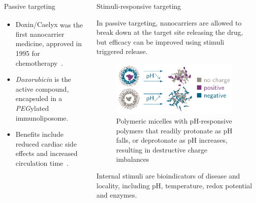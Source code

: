 \documentclass[final]{beamer}
\begin{document}
\begin{frame}[plain]
\begin{columns}[t,onlytextwidth]
\begin{block}{Passive targeting\strut}
        \begin{example}
          \begin{itemize}
            \item \alert{Doxin\textsuperscript{\textregistered}/Caelyx\textsuperscript{\textregistered}} was the first nanocarrier medicine, approved in 1995 for chemotherapy~\cite{harrison1995liposomal}.

            \item \emph{Doxorubicin} is the active compound, encapsuled in a \emph{PEG}ylated \alert{immunoliposome}.

            \item Benefits include \alert{reduced cardiac side effects} and \alert{increased circulation time}~\cite{wicki2015nanomedicine}.

          \end{itemize}
        \end{example}

      \end{block}

      \begin{block}{Stimuli-responsive targeting\strut}

        In \alert{passive targeting}, nanocarriers are allowed to break down at the target site releasing the drug, but efficacy can be improved using \alert{stimuli triggered release}.

        \begin{figure}
          \centering
          \includegraphics[scale=2.4]{tikz/ph_responsive.pdf}
          \caption{Polymeric micelles with pH-responsive polymers that readily protonate as pH falls, or deprotonate as pH increases, resulting in destructive charge imbalances~\cite{sun2014engineered}}
          \label{fig:ph}
        \end{figure}

        \alert{Internal stimuli} are bioindicators of disease and locality, including \alert{pH}, \alert{temperature}, \alert{redox potential} and \alert{enzymes}.


\end{block}
\end{columns}
\end{frame}
\end{document}

